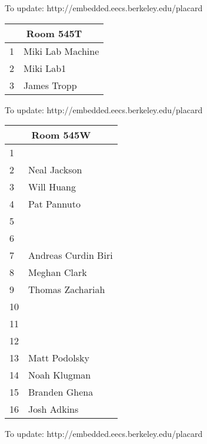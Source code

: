 \documentclass{article}
\begin{document}
{\scriptsize To update: http://embedded.eecs.berkeley.edu/placard}
\vspace{1in}

\noindent
\begin{tabular}{|l|l|}
\hline
\multicolumn{2}{|c|}{Room 545T} \\ \hline\hline
1&Miki Lab Machine\\
2&Miki Lab1\\
3&James Tropp\\

\hline
\end{tabular}

{\scriptsize To update: http://embedded.eecs.berkeley.edu/placard}
\vspace{1in}

\noindent
\begin{tabular}{|l|l|}
\hline
\multicolumn{2}{|c|}{Room 545W} \\ \hline\hline
1& \\
2&Neal Jackson\\
3&Will Huang\\
4&Pat Pannuto\\
5& \\
6& \\
7&Andreas Curdin Biri\\
8&Meghan Clark\\
9&Thomas Zachariah\\
10& \\
11& \\
12& \\
13&Matt Podolsky\\
14&Noah Klugman\\
15&Branden Ghena\\
16&Josh Adkins\\

\hline
\end{tabular}

{\scriptsize To update: http://embedded.eecs.berkeley.edu/placard}
\end{document}
